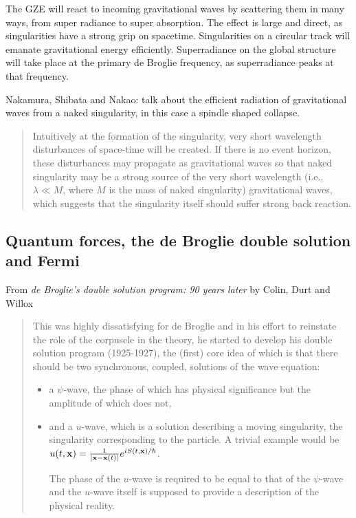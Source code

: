 \documentclass[../rzero]{subfiles}
\begin{document}
The GZE will react to incoming gravitational waves by scattering them in many ways, from super radiance to super absorption. The effect is large and direct, as singularities have a strong grip on spacetime. Singularities on a circular track will emanate gravitational energy efficiently. Superradiance on the global structure will take place at the primary de Broglie frequency, as superradiance peaks at that frequency. 

Nakamura, Shibata and Nakao:\cite{Nakamura1993} talk about the efficient radiation of gravitational waves from a naked singularity, in this case a spindle shaped collapse.
\begin{quotation}
	Intuitively at the formation of the singularity, very short wavelength disturbances of space-time will be created. If there is no event horizon, these disturbances may propagate as gravitational waves so that naked singularity may be a strong source of the very short wavelength (i.e., $\lambda \ll M$, where $M$ is the mass of naked singularity) gravitational waves, which suggests that the singularity itself should suffer strong back reaction.
\end{quotation}

\subsection{Quantum forces, the de Broglie double solution and Fermi}


From \textit{de Broglie’s double solution program: 90 years later} by Colin, Durt and Willox\cite{Colin} 
\begin{quotation}
This was highly dissatisfying for de Broglie and in his effort to reinstate the role of the corpuscle in the theory, he started to develop his double solution program (1925-1927), the (first) core idea of which is that there should be two synchronous, coupled, solutions of the wave equation: 
\begin{itemize}
\item a $\psi$-wave, the phase of which has physical significance but the amplitude of which does not, 
\item and a $u$-wave, which is  a solution describing a moving singularity, the singularity corresponding to the particle. 
A trivial example would be $u(t,{\bf x})=\frac{1}{|{\bf x}-{\bf x}(t)|}e^{i S(t,{\bf x})/\hbar}$.

The phase of the $u$-wave is required to be equal to that of the $\psi$-wave and the $u$-wave itself is supposed to provide a description of the physical reality. 
\end{itemize}
\end{quotation}
\end{document}
